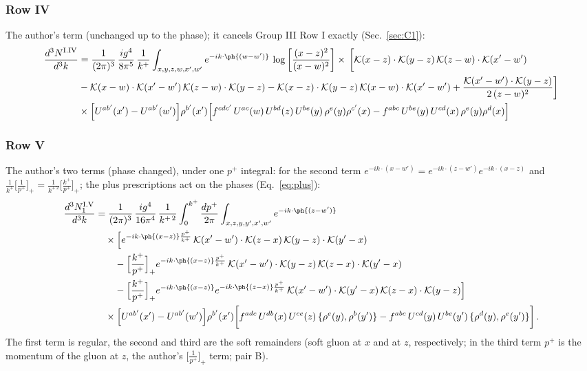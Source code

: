 \subsubsection*{Row IV}
The author's term (unchanged up to the phase); it cancels Group III Row I exactly (Sec.~\ref{sec:C1}):
\begin{align}
\frac{d^{3}N^{\rm I.IV}}{d^{3}k} & = \frac{1}{(2\pi)^{3}}\,\frac{ig^{4}}{8\pi^{5}}\,\frac{1}{k^{+}}\int_{x,y,z,w,x',w'}e^{-ik\cdot\ph{(w-w')}}\,\log\left[\frac{(x-z)^{2}}{(x-w)^{2}}\right]\times\,\bigg[\mathcal{K}(x-z)\cdot\mathcal{K}(y-z)\,\mathcal{K}(z-w)\cdot\mathcal{K}(x'-w')\notag \\ & -\mathcal{K}(x-w)\cdot\mathcal{K}(x'-w')\,\mathcal{K}(z-w)\cdot\mathcal{K}(y-z)-\mathcal{K}(x-z)\cdot\mathcal{K}(y-z)\,\mathcal{K}(x-w)\cdot\mathcal{K}(x'-w')+\frac{\mathcal{K}(x'-w')\cdot\mathcal{K}(y-z)}{2\,(z-w)^{2}}\bigg]\notag \\ & \times\Big[U^{ab'}(x')-U^{ab'}(w')\Big]\rho^{b'}(x')\Big[f^{cdc'}\,U^{ac}(w)\,U^{bd}(z)\,U^{be}(y)\,\rho^{e}(y)\rho^{c'}(x)-f^{abc}\,U^{be}(y)\,U^{cd}(x)\,\rho^{e}(y)\rho^{d}(x)\Big]\label{eq:B-I4}
\end{align}
\subsubsection*{Row V}
The author's two terms (phase changed), under one $p^{+}$ integral: for the second term $e^{-ik\cdot(x-w')}=e^{-ik\cdot(z-w')}e^{-ik\cdot(x-z)}$ and $\frac{1}{k^{+}}\big[\frac{1}{p^{+}}\big]_{+}=\frac{1}{k^{+\,2}}\big[\frac{k^{+}}{p^{+}}\big]_{+}$; the plus prescriptions act on the phases (Eq.~\eqref{eq:plus}):
\begin{align}
\frac{d^{3}N^{\rm I.V}_{1}}{d^{3}k} & =\frac{1}{(2\pi)^{3}}\,\frac{ig^{4}}{16\pi^{4}}\,\frac{1}{k^{+\,2}}\int_{0}^{k^{+}}\frac{dp^{+}}{2\pi}\int_{x,z,y,y',x',w'}e^{-ik\cdot\ph{(z-w')}}\notag\\
&\quad\times\Big[e^{-ik\cdot\ph{(x-z)}\frac{p^{+}}{k^{+}}}\,\mathcal{K}(x'-w')\cdot\mathcal{K}(z-x)\,\mathcal{K}(y-z)\cdot\mathcal{K}(y'-x)\notag\\
&\qquad-\Big[\frac{k^{+}}{p^{+}}\Big]_{+}e^{-ik\cdot\ph{(x-z)}\frac{p^{+}}{k^{+}}}\,\mathcal{K}(x'-w')\cdot\mathcal{K}(y-z)\,\mathcal{K}(z-x)\cdot\mathcal{K}(y'-x)\notag\\
&\qquad-\Big[\frac{k^{+}}{p^{+}}\Big]_{+}e^{-ik\cdot\ph{(x-z)}}e^{-ik\cdot\ph{(z-x)}\frac{p^{+}}{k^{+}}}\,\mathcal{K}(x'-w')\cdot\mathcal{K}(y'-x)\,\mathcal{K}(z-x)\cdot\mathcal{K}(y-z)\Big]\notag\\
&\quad\times\Big[U^{ab'}(x')-U^{ab'}(w')\Big]\rho^{b'}(x')\bigg[f^{adc}\,U^{db}(x)\,U^{ce}(z)\,\{\rho^{e}(y),\rho^{b}(y')\}-f^{abc}\,U^{cd}(y)\,U^{be}(y')\,\{\rho^{d}(y),\rho^{e}(y')\}\bigg]\,.\label{eq:B-I5}
\end{align}
The first term is regular, the second and third are the soft remainders (soft gluon at $x$ and at $z$, respectively; in the third term $p^{+}$ is the momentum of the gluon at $z$, the author's $\big[\frac{1}{p^{+}}\big]_{+}$ term; pair B).
